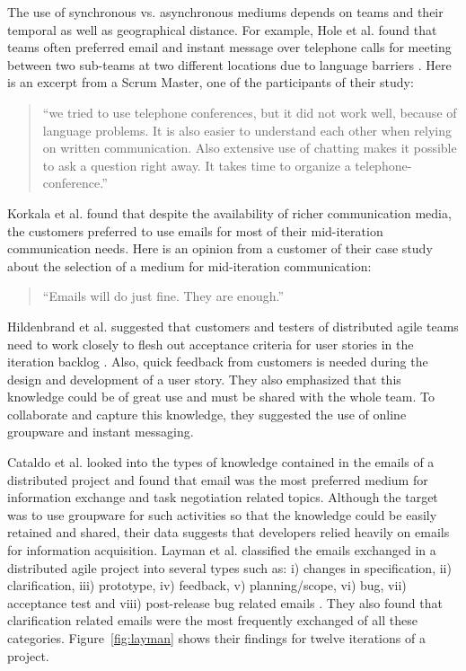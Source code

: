 The use of synchronous vs. asynchronous mediums depends on teams and their temporal as well as geographical distance. For example, Hole et al. found that teams often preferred email and instant message over telephone calls for meeting between two sub-teams at two different locations due to language barriers \cite{a_case_study_of}. Here is an excerpt from a Scrum Master, one of the participants of their study:\\

\begin{quote}
``we tried to use telephone conferences, but it did not work well, because of language problems. It is also easier to understand each other when relying on written communication. Also extensive use of chatting makes it possible to ask a question right away. It takes time to organize a telephone-conference.''
\end{quote}

Korkala et al. found that despite the availability of richer communication media, the customers preferred to use emails for most of their mid-iteration communication needs\cite{communication_in_distributed}. Here is an opinion from a customer of their case study about the selection of a medium for mid-iteration communication:\\
\begin{quote}
	``Emails will do just fine. They are enough.''
\end{quote}

Hildenbrand et al. suggested that customers and testers of distributed agile teams need to work closely to flesh out acceptance criteria for user stories in the iteration backlog \cite{agile_methods}. Also, quick feedback from customers is needed during the design and development of a user story. They also emphasized that this knowledge could be of great use and must be shared with the whole team. To collaborate and capture this knowledge, they suggested the use of online groupware and instant messaging.

Cataldo et al. looked into the types of knowledge contained in the emails of a distributed project and found that email was the most preferred medium for information exchange and task negotiation related topics\cite{on_coord}. Although the target was to use groupware for such activities so that the knowledge could be easily retained and shared, their data suggests that developers relied heavily on emails for information acquisition. Layman et al. classified the emails exchanged in a distributed agile project into several types such as: i) changes in specification, ii) clarification, iii) prototype, iv) feedback, v) planning/scope, vi) bug, vii) acceptance test and viii) post-release bug related emails \cite{essential_communication}. They also found that clarification related emails were the most frequently exchanged of all these categories. Figure~\ref{fig:layman} shows their findings for twelve iterations of a project.


